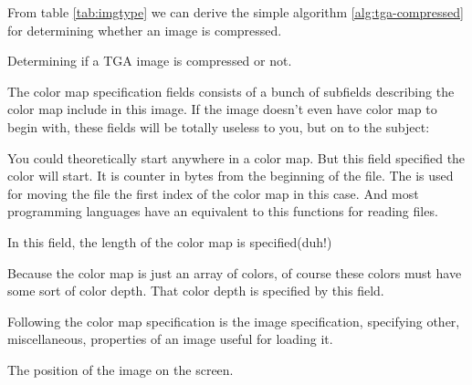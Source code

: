 \begin{refsection}
  From table \ref{tab:imgtype} we can derive the simple algorithm
  \ref{alg:tga-compressed} for determining whether an image is
  compressed.

  \begin{algorithm}[H]
    \caption{Determining if a TGA image is compressed or not.}
    \label{alg:tga-compressed}
    \begin{algorithmic}[1]
    \end{algorithmic}
  \end{algorithm}


  The color map specification fields consists of a bunch of subfields
  describing the color map include in this image. If the image doesn't
  even have color map to begin with, these fields will be totally
  useless to you, but on to the subject:


  You could theoretically start anywhere in a color map. But this
  field specified the color will start. It is counter in bytes from
  the beginning of the file. The  is used for moving
  the file the first index of the color map in this case. And most
  programming languages have an equivalent to this functions for
  reading files.


  In this field, the length of the color map is specified(duh!)


  Because the color map is just an array of colors, of course these
  colors must have some sort of color depth. That color depth is
  specified by this field.


  Following the color map specification is the image specification,
  specifying other, miscellaneous, properties of an image useful for
  loading it.



  The position of the image on the screen.


\end{refsection}
